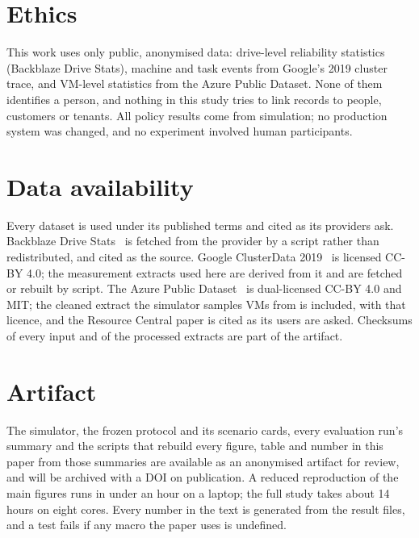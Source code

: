 \section*{Ethics}
This work uses only public, anonymised data: drive-level reliability statistics (Backblaze Drive
Stats), machine and task events from Google's 2019 cluster trace, and VM-level statistics from
the Azure Public Dataset. None of them identifies a person, and nothing in this study tries to
link records to people, customers or tenants. All policy results come from simulation; no
production system was changed, and no experiment involved human participants.

\section*{Data availability}
Every dataset is used under its published terms and cited as its providers ask.
Backblaze Drive Stats~\cite{backblaze2026drivestats} is fetched from the provider by a script rather than
redistributed, and cited as the source. Google ClusterData 2019~\cite{googleclusterdata2019} is
licensed CC-BY 4.0; the measurement extracts used here are derived from it and are fetched or
rebuilt by script. The Azure Public Dataset~\cite{cortez2017resource} is dual-licensed CC-BY 4.0
and MIT; the cleaned extract the simulator samples VMs from is included, with that licence, and
the Resource Central paper is cited as its users are asked. Checksums of every input and of the
processed extracts are part of the artifact.

\section*{Artifact}
The simulator, the frozen protocol and its scenario cards, every evaluation run's summary and
the scripts that rebuild every figure, table and number in this paper from those summaries are
available as an anonymised artifact for review, and will be archived with a DOI on publication.
A reduced reproduction of the main figures runs in under an hour on a laptop; the full study
takes about 14 hours on eight cores. Every number in the text is generated from the result files,
and a test fails if any macro the paper uses is undefined.
